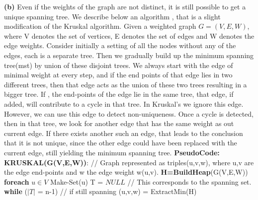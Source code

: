 \documentclass{article}
\renewcommand\part[1]{\vspace{.10in}\textbf{(#1)}}
\newcommand\pseudoCode{\vspace{.10in}\textbf{PseudoCode: }}
\begin{document}
  \part{b} Even if the weights of the graph are not distinct, it is still possible to get a unique spanning tree. We describe below an algorithm , that is a slight modification of the Kruskal algorithm. Given a weighted graph $G=(V,E,W)$, where V denotes the set of vertices, E denotes the set of edges and W denotes the edge weights. Consider initially a setting of all the nodes without any of the edges, each is a separate tree. Then we gradually build up the minimum spanning tree(mst) by union of these disjoint trees. We always start with the edge of minimal weight at every step, and if the end points of that edge lies in two different trees, then that edge acts as the union of these two trees resulting in a bigger tree. If , the end-points of the edge lie in the same tree, that edge, if added, will contribute to a cycle in that tree. In Kruskal's we ignore this edge. However, we can use this edge to detect non-uniqueness. Once a cycle is detected, then in that tree, we look for another edge that has the same weight as out current edge. If there exists another such an edge, that leads to the conclusion that it is not unique, since the other edge could have been replaced with the current edge, still yielding the minimum spanning tree.   \newline
  \pseudoCode \newline
  \hspace*{0.0cm} \textbf {KRUSKAL(G(V,E,W))}: \newline
  \hspace*{0.5cm} //  Graph represented as triples(u,v,w), where u,v are the edge end-points and w the edge weight w(u,v). \newline
  \hspace*{0.5cm} \textbf {H=BuildHeap}(G(V,E,W)) \newline
  \hspace*{0.5cm} \textbf {foreach} $u \in V$ \newline
  \hspace*{1cm}     Make-Set(u) \newline
  \hspace*{0.5cm} T = $NULL$ // This corresponds to the spanning set. \newline
  \hspace*{0.5cm} \textbf {while} ($|T|$ = n-1) // if still spanning \newline
  \hspace*{1cm}		(u,v,w) = ExtractMin(H) \newline
\end{document}
